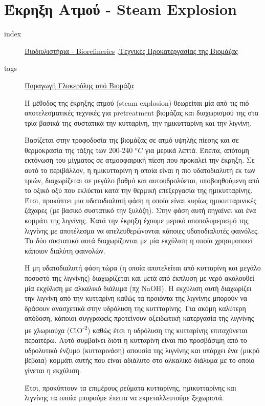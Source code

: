 \documentclass[11pt]{article}
\begin{document}
\section{Έκρηξη Ατμού - Steam Explosion}
\label{sec:org6f97644}
\begin{description}
\item[{index}] \href{\detokenize{../../../../org_roam/βιοδιυλιστηρια-08-05-22.org}}{Βιοδιυλιστήρια - Biorefineries} ,\href{\detokenize{../../../../org_roam/τεχνικες_προκατεργασιας_της_βιομαζας-09-11-22.org}}{Τεχνικές Προκατεργασίας της Βιομάζας}
\item[{tags}] \href{\detokenize{../../../../org_roam/παραγωγη_γλυκερολης_απο_βιομαζα-13-10-22.org}}{Παραγωγή Γλυκερόλης από Βιομάζα} 

Η μέθοδος της έκρηξης ατμού (steam explosion) θεωρείται μία από τις πιό αποτελεσματικές τεχνικές για pretreatment βιομάζας και διαχωρισμού της στα τρία βασικά της συστατικά την κυτταρίνη, την ημικυτταρίνη και την λιγνίνη.

Βασίζεται στην τροφοδοσία της βιομάζας σε ατμό υψηλής πίεσης και σε θερμοκρασία της τάξης των 200-240 \(^oC\) για μερικά λεπτά. Έπειτα, απότομη εκτόνωση του μίγματος σε ατμοσφαιρική πίεση που προκαλεί την έκρηξη. Σε αυτό το περιβάλλον, η ημικυτταρίνη η οποία είναι η πιο υδατοδιαλυτή εκ των τριών, διαχωρίζεται σε μεγάλο βαθμό και αυτουδρολύεται, υποβοηθούμενη από το οξικό οξύ που εκλύεται κατά την θερμική επεξεργασία της ημικυτταρίνης. Έτσι, προκύπτει μια υδατοδιαλυτή φάση η οποία είναι κυρίως ημικυτταρινικές ζάχαρες (με βασικό συστατικό την ξυλόζη). Στην φάση αυτή πηγαίνει και ένα κομμάτι της λιγνίνης. Κατά την έκρηξη έχουμε μερικό αποπολυμερισμό της λιγνίνης με αποτέλεσμα να απελευθερώνονται κάποιες υδατοδιαλυτές φαινόλες. Τα δύο συστατικά αυτά διαχωρίζονται με μία εκχύλιση η οποία χρησιμοποιεί κάποιον διαλύτη φαινολών.

Η μη υδατοδιαλυτή φάση τώρα (η οποία αποτελείται από κυτταρίνη και μεγάλο ποσοστό της λιγνίνης) διαχωρίζεται και μετά από έκπλυση με νερό ακολουθεί μία εκχύλιση με αλκαλικό διάλυμα (πχ NaOH). Η εκχύλιση αυτή διαχωρίζει την λιγνίνη από την κυτταρίνη καθώς τα προιόντα της λιγνίνης μπορούν να δράσουν ανασχετικά στην υδρόλυση της κυττταρίνης. Για ακόμη καλύτερη απόδοση, κάποιοι συγγραφείς προτείνουν οξειδωτική κατεργασία της λιγνίνης με χλωριούχα (ClO\textsuperscript{-2}) καθώς έτσι η υδρόλυση της κυτταρίνης επιταχύνεται περαιτέρω. Αυτό συμβαίνει διότι η κυτταρίνη είναι πιό προσβάσιμη από το υδρολυτικό ένζυμο (κυτταρινάση) απουσία της λιγνίνης και υπάρχει ένα (μικρό βέβαια) κομμάτι αυτής που είναι αδιάλυτο στο αλκαλικό διάλυμα με το οποίο γίνεται η εκχύλιση.

Έτσι, προκύπτουν τα επιμέρους ρεύματα κυτταρίνης, ημικυτταρίνης και λιγνίνης τα οποία μπορούμε έπειτα να εκμεταλλευτούμε ξεχωριστά.
\end{description}
\end{document}
